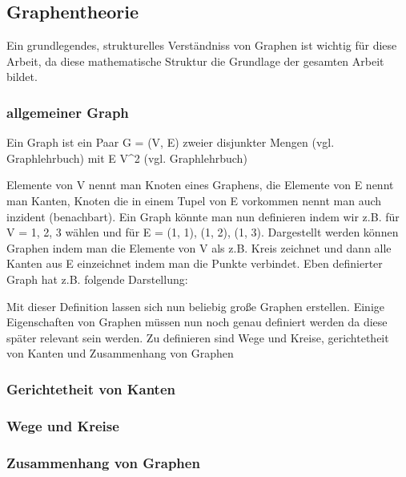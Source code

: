 \subsection*{Graphentheorie}

Ein grundlegendes, strukturelles Verständniss von Graphen ist wichtig für diese Arbeit, da diese mathematische Struktur
die Grundlage der gesamten Arbeit bildet.
\subsubsection*{allgemeiner Graph}
Ein Graph ist ein Paar \textrm{G = (V, E)} zweier disjunkter Mengen (vgl. Graphlehrbuch) mit E \subseteq V^2 (vgl. Graphlehrbuch)


Elemente von V nennt man Knoten eines Graphens, die Elemente von E nennt man Kanten, Knoten die in einem Tupel von E vorkommen
nennt man auch inzident (benachbart).
Ein Graph könnte man nun definieren indem wir z.B. für V = {1, 2, 3} wählen und für E = {(1, 1), (1, 2), (1, 3)}.
Dargestellt werden können Graphen indem man die Elemente von V als z.B. Kreis zeichnet und dann alle Kanten aus E
einzeichnet indem man die Punkte verbindet. Eben definierter Graph hat z.B. folgende Darstellung:


Mit dieser Definition lassen sich nun beliebig große Graphen erstellen.
Einige Eigenschaften von Graphen müssen nun noch genau definiert werden da diese später relevant sein werden.
Zu definieren sind Wege und Kreise, gerichtetheit von Kanten und Zusammenhang von Graphen

\subsubsection*{Gerichtetheit von Kanten}

\subsubsection*{Wege und Kreise}

\subsubsection*{Zusammenhang von Graphen}

